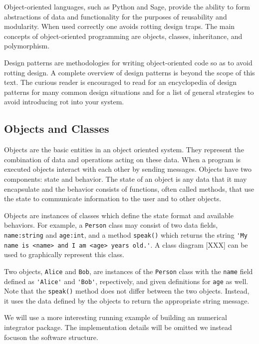Object-oriented languages, such as Python and Sage, provide the ability to form
abstractions of data and functionality for the purposes of reusability and
modularity. When used correctly one avoids rotting design traps. The main
concepts of object-oriented programming are objects, classes, inheritance, and
polymorphism.

Design patterns are methodologies for writing object-oriented code so as to
avoid rotting design. A complete overview of design patterns is beyond the scope
of this text. The curious reader is encouraged to read \cite{gamma1995design}
for an encyclopedia of design patterns for many common design situations and
\cite{martin2000design} for a list of general strategies to avoid introducing
rot into your system.



\subsection{Objects and Classes}

Objects are the basic entities in an object oriented system. They represent the
combination of data and operations acting on these data. When a program is
executed objects interact with each other by sending messages. Objects have two
components: state and behavior. The state of an object is any data that it may
encapsulate and the behavior consists of functions, often called methods, that
use the state to communicate information to the user and to other objects.

Objects are instances of classes which define the state format and available
behaviors. For example, a \verb=Person= class may consist of two data fields,
\verb=name:string= and \verb=age:int=, and a method \verb=speak()= which returns
the string \verb='My name is <name> and I am <age> years old.'=. A class diagram
[XXX] can be used to graphically represent this class.


Two objects, \verb=Alice= and \verb=Bob=, are instances of the \verb=Person=
class with the \verb=name= field defined as \verb='Alice'= and \verb='Bob'=,
repectively, and given definitions for \verb=age= as well. Note that the
\verb=speak()= method does not differ between the two objects. Instead, it uses
the data defined by the objects to return the appropriate string message.

We will use a more interesting running example of building an numerical
integrator package. The implementation details will be omitted we instead
focuson the software structure.




